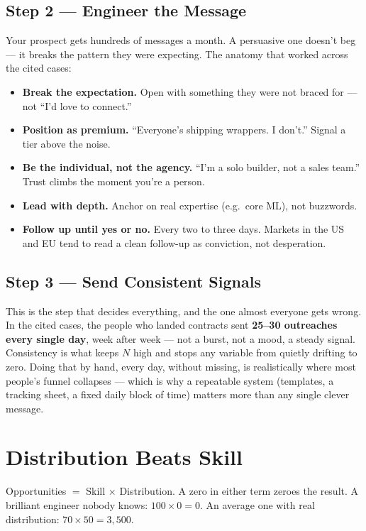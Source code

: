 \subsection{Step 2 --- Engineer the Message}

Your prospect gets hundreds of messages a month. A persuasive one doesn't beg --- it breaks the pattern they were
expecting. The anatomy that worked across the cited cases:

\begin{itemize}
  \item \textbf{Break the expectation.} Open with something they were not braced for --- not ``I'd love to
  connect.''
  \item \textbf{Position as premium.} ``Everyone's shipping wrappers. I don't.'' Signal a tier above the noise.
  \item \textbf{Be the individual, not the agency.} ``I'm a solo builder, not a sales team.'' Trust climbs the
  moment you're a person.
  \item \textbf{Lead with depth.} Anchor on real expertise (e.g.\ core ML), not buzzwords.
  \item \textbf{Follow up until yes or no.} Every two to three days. Markets in the US and EU tend to read a
  clean follow-up as conviction, not desperation.
\end{itemize}

\subsection{Step 3 --- Send Consistent Signals}

This is the step that decides everything, and the one almost everyone gets wrong. In the cited cases, the people
who landed contracts sent \textbf{25--30 outreaches every single day}, week after week --- not a burst, not a
mood, a steady signal. Consistency is what keeps $N$ high and stops any variable from quietly drifting to zero.
Doing that by hand, every day, without missing, is realistically where most people's funnel collapses --- which
is why a repeatable system (templates, a tracking sheet, a fixed daily block of time) matters more than any
single clever message.

\section{Distribution Beats Skill}

\begin{keytakeaway}
Opportunities $=$ Skill $\times$ Distribution. A zero in either term zeroes the result. A brilliant engineer
nobody knows: $100 \times 0 = 0$. An average one with real distribution: $70 \times 50 = 3{,}500$.
\end{keytakeaway}

